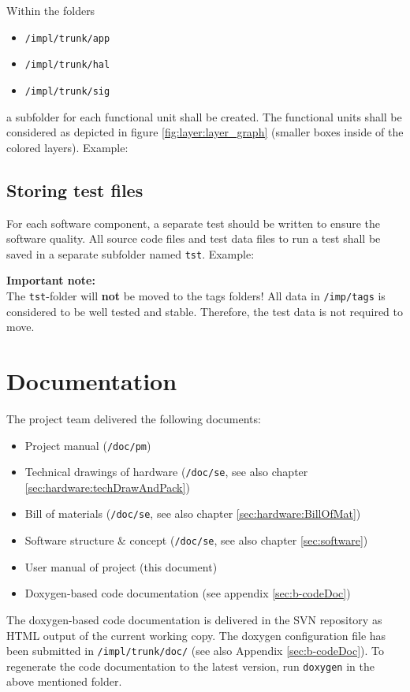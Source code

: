 Within the folders 
\begin{itemize}
	\item \texttt{/impl/trunk/app}
	\item \texttt{/impl/trunk/hal}
	\item \texttt{/impl/trunk/sig}
\end{itemize}
a subfolder for each functional unit shall be created. The functional units shall be considered as depicted in figure \ref{fig:layer:layer_graph} (smaller boxes inside of the colored layers). Example:

\subsection*{Storing test files}
\label{sec:work:groupware:test}
For each software component, a separate test should be written to ensure the software quality. All source code files and test data files to run a test shall be saved in a separate subfolder named \texttt{tst}. Example:


\textbf{Important note:}\\
The \texttt{tst}-folder will \textbf{not} be moved to the tags folders! All data in \texttt{/imp/tags} is considered to be well tested and stable. Therefore, the test data is not required to move.

\section{Documentation}
\label{sec:work:docu}
The project team delivered the following documents:
\begin{itemize}
	\item Project manual (\texttt{/doc/pm})
	\item Technical drawings of hardware (\texttt{/doc/se}, see also chapter \ref{sec:hardware:techDrawAndPack})
	\item Bill of materials (\texttt{/doc/se}, see also chapter \ref{sec:hardware:BillOfMat})
	\item Software structure \& concept (\texttt{/doc/se}, see also chapter \ref{sec:software})
	\item User manual of project (this document)
	\item Doxygen-based code documentation (see appendix \ref{sec:b-codeDoc})
\end{itemize}

The doxygen-based code documentation is delivered in the SVN repository as HTML output of the current working copy. The doxygen configuration file has been submitted in \texttt{/impl/trunk/doc/} (see also Appendix \ref{sec:b-codeDoc}). To regenerate the code documentation to the latest version, run \texttt{doxygen} in the above mentioned folder.